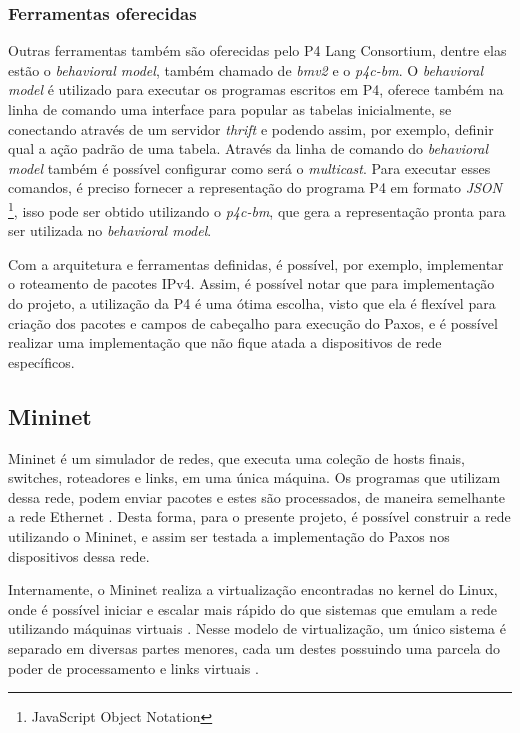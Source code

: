 \documentclass[
    12pt,
    openright, 
    oneside,
    a4paper,
    french,
    english,
    brazil
    ]{facom-ufu-abntex2}
\theoremstyle{definition}
\begin{document}
\subsubsection{Ferramentas oferecidas}
Outras ferramentas também são oferecidas pelo P4 Lang Consortium, dentre elas estão o 
\emph{behavioral model}, também chamado de \emph{bmv2} e o \emph{p4c-bm}. O \emph{behavioral model} é utilizado 
para executar os programas escritos em P4, oferece também na linha de comando uma interface 
para popular as tabelas inicialmente, se conectando através de um servidor \emph{thrift} e podendo 
assim, por exemplo, definir qual a ação padrão de uma tabela. Através da linha de comando do 
\emph{behavioral model} também é possível configurar como será o \emph{multicast}. Para executar esses 
comandos, é preciso fornecer a representação do programa P4 em formato \emph{JSON}
\footnote{JavaScript Object Notation}, isso pode ser obtido utilizando o \emph{p4c-bm}, que gera a 
representação pronta para ser utilizada no \emph{behavioral model}.

Com a arquitetura e ferramentas definidas, é possível, por exemplo, implementar o roteamento 
de pacotes IPv4. Assim, é possível notar que para implementação do projeto, a utilização da P4
é uma ótima escolha, visto que ela é flexível para criação dos pacotes e campos de cabeçalho
para execução do Paxos, e é possível realizar uma implementação que não fique atada a 
dispositivos de rede específicos.

\subsection{Mininet}
Mininet é um simulador de redes, que executa uma coleção de hosts finais, switches, 
roteadores e links, em uma única máquina. Os programas que utilizam dessa rede, podem enviar
pacotes e estes são processados, de maneira semelhante a rede Ethernet \cite{mininetDocs}.
Desta forma, para o presente projeto, é possível construir a rede utilizando o Mininet, e 
assim ser testada a implementação do Paxos nos dispositivos dessa rede.

Internamente, o Mininet realiza a virtualização encontradas no kernel do Linux, onde é possível
iniciar e escalar mais rápido do que sistemas que emulam a rede utilizando máquinas virtuais
\cite{mininetDocs}. Nesse modelo de virtualização, um único sistema é separado em diversas
partes menores, cada um destes possuindo uma parcela do poder de processamento e links virtuais
\cite{mininetDocs}.
\end{document}
